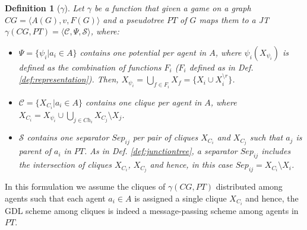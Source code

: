 \documentclass{aamas2012}
\newtheorem{definition}{Definition}
\begin{document}
\begin{definition}[$\gamma$]
\label{def:gamma}
Let $\gamma$ be a function that given a game on a graph $CG=\langle A(G), v,
F(G)\rangle$ and a pseudotree $PT$ of $G$ maps them to a JT
$\gamma(CG, PT)=\langle \mathcal{C}, \Psi, \mathcal{S} \rangle$, where:
\begin{itemize}
  \item $\Psi = \{\psi_i \vert a_i\in A\}$ contains one potential per
   agent in $A$, where $\psi_i(X_{\psi_i})$ is defined as the
   combination of functions $F_i$ ($F_i$ defined as in
   Def. \ref{def:representation}). Then, 
   $X_{\psi_i}=\bigcup_{f\in F_i} X_f = \{ X_i \cup X^{\setminus r}_i\}$.
   \item $\mathcal{C} = \{X_{C_i} \vert a_i\in A\}$ contains one clique per
   agent in $A$, where $X_{C_i}= X_{\psi_i} \cup \bigcup_{j\in Ch_i}
   X_{C_j} \setminus X_j$.
   \item $\mathcal{S}$ contains one separator
   $Sep_{ij}$ per pair of cliques $X_{C_i}$ and $X_{C_j}$
   such that $a_j$ is parent of $a_i$ in $PT$. As in Def.
   \ref{def:junctiontree}, a separator $Sep_{ij}$ includes the
   intersection of cliques $X_{C_i}$, $X_{C_j}$  and hence, in this case $Sep_{ij}= X_{C_i}\setminus X_i$. 
 \end{itemize} 
\end{definition}
In this formulation we assume the cliques of $\gamma(CG, PT)$
distributed among agents such that each agent $a_i\in A$ is assigned a single
clique $X_{C_i}$ and hence, the GDL scheme among cliques is
indeed a message-passing scheme among agents in $PT$.
\end{document}
